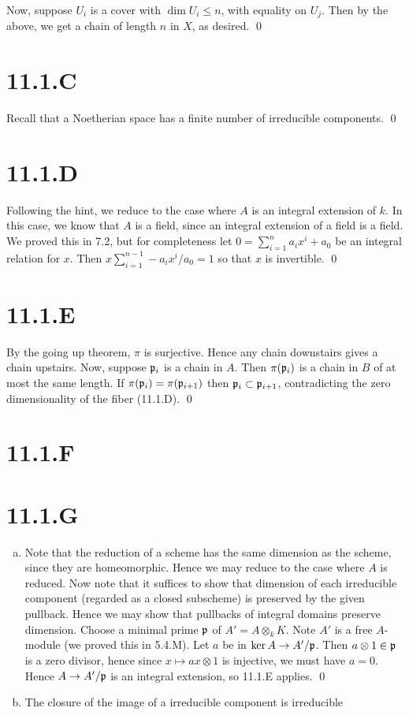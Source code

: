 \documentclass{article}
\begin{document}
Now, suppose $U_i$ is a cover with $\dim U_i \leq n$,
with equality on $U_j$. Then by the above, we get a chain of
length $n$ in $X$, as desired. \qed

\section{11.1.C}
Recall that a Noetherian space has a finite number of irreducible components.
\qed

\section{11.1.D}
Following the hint, we reduce to the case where $A$ is an
integral extension of $k$. In this case, we know that
$A$ is a field, since an integral extension of a field is a
field. We proved this in 7.2, but for completeness let $0 = \sum_{i=1}^n a_ix^i+a_0$
be an integral relation for $x$. Then $x\sum_{i=1}^{n-1}-a_ix^i/a_0=1$
so that $x$ is invertible. \qed

\section{11.1.E}
By the going up theorem, $\pi$ is surjective. Hence any chain
downstairs gives a chain upstairs. Now, suppose $\mathfrak{p}_i$ is a
chain in $A$. Then $\pi(\mathfrak{p}_i)$ is a chain in
$B$ of at most the same length. If $\pi(\mathfrak{p}_i) = \pi(\mathfrak{p}_{i+1})$
then $\mathfrak{p}_i \subset \mathfrak{p}_{i+1}$, contradicting the zero dimensionality of the fiber
(11.1.D). \qed

\section{11.1.F}
\section{11.1.G}
\begin{enumerate}[a.]
    \item Note that the reduction of a scheme has the same dimension as the scheme, since
          they are homeomorphic. Hence we may reduce to the case where
          $A$ is reduced. Now note that it suffices to show that
          dimension of each irreducible component (regarded as a closed subscheme) is
          preserved by the given pullback. Hence we may show that pullbacks of integral
          domains preserve dimension. Choose a minimal prime $\mathfrak{p}$ of
          $A'=A\otimes_k K$. Note $A'$ is a free
          $A$-module (we proved this in 5.4.M). Let
          $a$ be in $\ker A \to A'/\mathfrak{p}$. Then
          $a \otimes 1 \in \mathfrak{p}$ is a zero divisor, hence since $x \mapsto ax \otimes 1$ is
          injective, we must have $a=0$. Hence $A \to A'/\mathfrak{p}$ is
          an integral extension, so 11.1.E applies. \qed
    \item The closure of the image of a irreducible component is irreducible
\end{enumerate}
\end{document}
